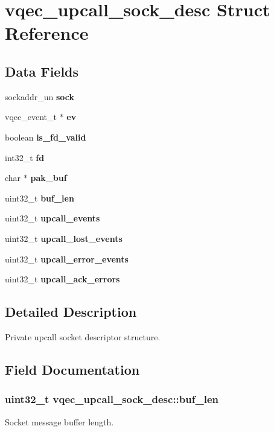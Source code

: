 \section{vqec\_\-upcall\_\-sock\_\-desc Struct Reference}
\label{structvqec__upcall__sock__desc}
\subsection*{Data Fields}
\begin{CompactItemize}
\item 
sockaddr\_\-un \bf{sock}
\item 
vqec\_\-event\_\-t $\ast$ \bf{ev}
\item 
boolean \bf{is\_\-fd\_\-valid}
\item 
int32\_\-t \bf{fd}
\item 
char $\ast$ \bf{pak\_\-buf}
\item 
uint32\_\-t \bf{buf\_\-len}
\item 
uint32\_\-t \bf{upcall\_\-events}
\item 
uint32\_\-t \bf{upcall\_\-lost\_\-events}
\item 
uint32\_\-t \bf{upcall\_\-error\_\-events}
\item 
uint32\_\-t \bf{upcall\_\-ack\_\-errors}
\end{CompactItemize}


\subsection{Detailed Description}
Private upcall socket descriptor structure. 



\subsection{Field Documentation}
\subsubsection{\setlength{\rightskip}{0pt plus 5cm}uint32\_\-t \bf{vqec\_\-upcall\_\-sock\_\-desc::buf\_\-len}}\label{structvqec__upcall__sock__desc_df6c2b4aeb5452adb1e14a56cf7702de}


Socket message buffer length. 
